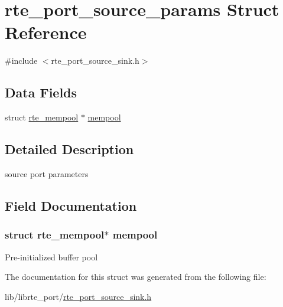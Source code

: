 \hypertarget{structrte__port__source__params}{}\section{rte\+\_\+port\+\_\+source\+\_\+params Struct Reference}
\label{structrte__port__source__params}


{\ttfamily \#include $<$rte\+\_\+port\+\_\+source\+\_\+sink.\+h$>$}

\subsection*{Data Fields}
\begin{DoxyCompactItemize}
\item 
struct \hyperlink{structrte__mempool}{rte\+\_\+mempool} $\ast$ \hyperlink{structrte__port__source__params_a19a9a50b40f0f825e52263951ba54fc0}{mempool}
\end{DoxyCompactItemize}


\subsection{Detailed Description}
source port parameters 

\subsection{Field Documentation}
\hypertarget{structrte__port__source__params_a19a9a50b40f0f825e52263951ba54fc0}{}
\subsubsection[{mempool}]{\setlength{\rightskip}{0pt plus 5cm}struct {\bf rte\+\_\+mempool}$\ast$ mempool}\label{structrte__port__source__params_a19a9a50b40f0f825e52263951ba54fc0}
Pre-\/initialized buffer pool 

The documentation for this struct was generated from the following file\+:\begin{DoxyCompactItemize}
\item 
lib/librte\+\_\+port/\hyperlink{rte__port__source__sink_8h}{rte\+\_\+port\+\_\+source\+\_\+sink.\+h}\end{DoxyCompactItemize}
